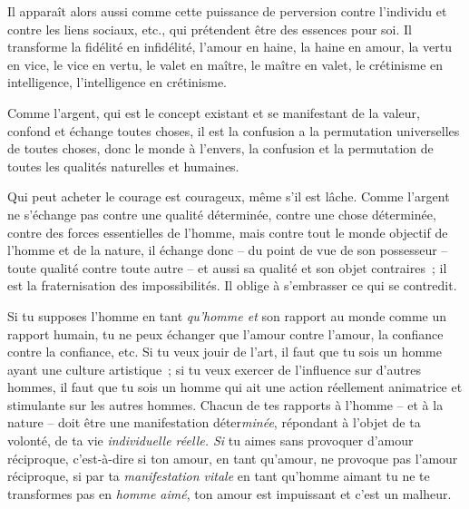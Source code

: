 \documentclass[french,twoside]{book} %
\begin{document}
Il apparaît alors aussi comme cette puissance de perversion contre l’individu et contre les liens sociaux, etc., qui prétendent être des essences pour soi. Il transforme la fidélité en infidélité, l’amour en haine, la haine en amour, la vertu en vice, le vice en vertu, le valet en maître, le maître en valet, le crétinisme en intelligence, l’intelligence en crétinisme.\par
Comme l’argent, qui est le concept existant et se manifestant de la valeur, confond et échange toutes choses, il est la confusion a la permutation universelles de toutes choses, donc le monde à l’envers, la confusion et la permutation de toutes les qualités naturelles et humaines.\par
Qui peut acheter le courage est courageux, même s’il est lâche. Comme l’argent ne s’échange pas contre une qualité déterminée, contre une chose déterminée, contre des forces essentielles de l’homme, mais contre tout le monde objectif de l’homme et de la nature, il échange donc – du point de vue de son possesseur – toute qualité contre toute autre – et aussi sa qualité et son objet contraires ; il est la fraternisation des impossibilités. Il oblige à s’embrasser ce qui se contredit.\par
Si tu supposes l’homme en tant \emph{qu’homme et} son rapport au monde comme un rapport humain, tu ne peux échanger que l’amour contre l’amour, la confiance contre la confiance, etc. Si tu veux jouir de l’art, il faut que tu sois un homme ayant une culture artistique ; si tu veux exercer de l’influence sur d’autres hommes, il faut que tu sois un homme qui ait une action réellement animatrice et stimulante sur les autres hommes. Chacun de tes rapports à l’homme – et à la nature – doit être une manifestation déter\emph{minée}, répondant à l’objet de ta volonté, de ta vie \emph{individuelle réelle. Si} tu aimes sans provoquer d’amour réciproque, c’est-à-dire si ton amour, en tant qu’amour, ne provoque pas l’amour réciproque, si par ta \emph{manifestation vitale} en tant qu’homme aimant tu ne te transformes pas en \emph{homme aimé}, ton amour est impuissant et c’est un malheur.
\end{document}

